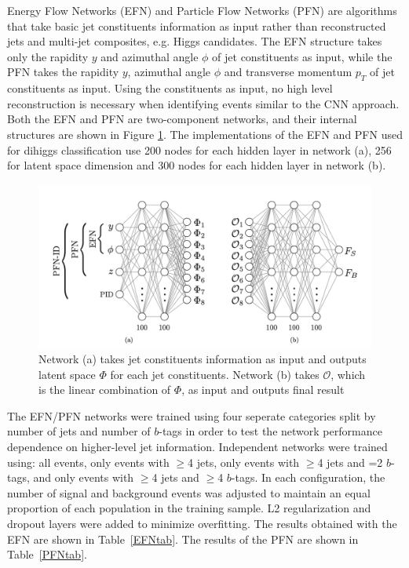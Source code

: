 \label{sec:EFN}
Energy Flow Networks (EFN) and Particle Flow Networks (PFN) are algorithms that take basic jet constituents information as input rather than reconstructed jets and multi-jet composites, e.g. Higgs candidates. The EFN structure takes only the rapidity ${y}$ and azimuthal angle ${\phi}$ of jet constituents as input, while the PFN takes the rapidity $y$, azimuthal angle $\phi$ and transverse momentum $p_{T}$ of jet constituents as input. Using the constituents as input, no high level reconstruction is necessary when identifying events similar to the CNN approach. Both the EFN and PFN are two-component networks, and their internal structures are shown in Figure \ref{fig:EFNArch}. The implementations of the EFN and PFN used for dihiggs classification use 200 nodes for each hidden layer in network (a), 256 for latent space dimension and 300 nodes for each hidden layer in network (b). 

\begin{figure}[ht!]
\centering
\includegraphics[scale=0.5]{./EFN/EFNArch.png}
\caption{Network (a) takes jet constituents information as input and outputs latent space $\Phi$ for each jet constituents. Network (b) takes $\mathcal{O}$, which is the linear combination of $\Phi$, as input and outputs final result}
\label{fig:EFNArch}
\end{figure}

The EFN/PFN networks were trained using four seperate categories split by number of jets and number of $b$-tags in order to test the network performance dependence on higher-level jet information. Independent networks were trained using: all events, only events with $\geq$4 jets, only events with $\geq$4 jets and =2 $b$-tags, and only events with $\geq$4 jets and $\geq$4 $b$-tags. In each configuration, the number of signal and background events was adjusted to maintain an equal proportion of each population in the training sample. L2 regularization and dropout layers were added to minimize overfitting. The results obtained with the EFN are shown in Table~\ref{EFNtab}. The results of the PFN are shown in Table~\ref{PFNtab}.

